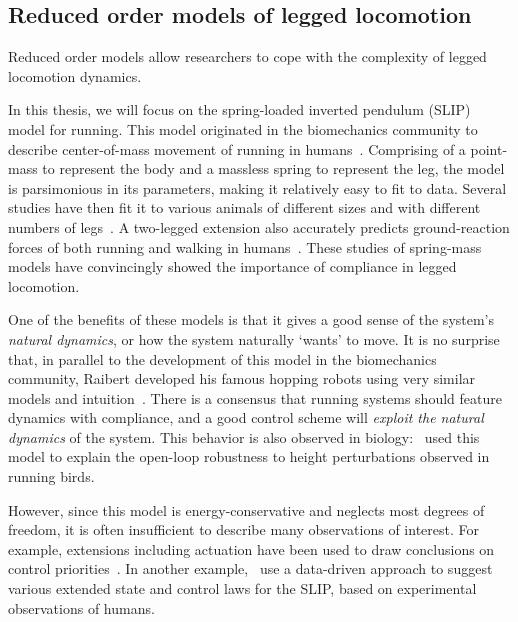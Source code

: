 \subsection{Reduced order models of legged locomotion}

Reduced order models allow researchers to cope with the complexity of legged locomotion dynamics. \par
In this thesis, we will focus on the spring-loaded inverted pendulum (SLIP) model for running. This model originated in the biomechanics community to describe center-of-mass movement of running in humans~\cite{blickhan1989spring}. Comprising of a point-mass to represent the body and a massless spring to represent the leg, the model is parsimonious in its parameters, making it relatively easy to fit to data.
Several studies have then fit it to various animals of different sizes and with different numbers of legs~\cite{blickhan1993similarity,daley2006running,jindrich2002dynamic}. A two-legged extension also accurately predicts ground-reaction forces of both running and walking in humans~\cite{geyer2006compliant}. These studies of spring-mass models have convincingly showed the importance of compliance in legged locomotion. \par
One of the benefits of these models is that it gives a good sense of the system's \emph{natural dynamics}, or how the system naturally `wants' to move.
It is no surprise that, in parallel to the development of this model in the biomechanics community, Raibert developed his famous hopping robots using very similar models and intuition~\cite[see Figure 2.5]{raibert1986legged}.
There is a consensus that running systems should feature dynamics with compliance, and a good control scheme will \emph{exploit the natural dynamics} of the system.
This behavior is also observed in biology:~\textcite{daley2006running} used this model to explain the open-loop robustness to height perturbations observed in running birds. \par
However, since this model is energy-conservative and neglects most degrees of freedom, it is often insufficient to describe many observations of interest. For example, extensions including actuation have been used to draw conclusions on control priorities~\cite{Birn-Jeffery3786,blum2014swing}. In another example,~\textcite{maus2015constructing} use a data-driven approach to suggest various extended state and control laws for the SLIP, based on experimental observations of humans. %

